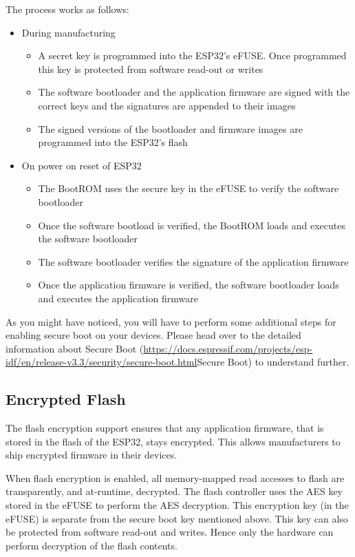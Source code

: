 \documentclass[main.tex]{subfiles}
\begin{document}
The process works as follows:
\begin{itemize}
\item During manufacturing
  \begin {itemize}
  \item A secret key is programmed into the ESP32's eFUSE. Once programmed this key is protected from software read-out or writes
  \item The software bootloader and the application firmware are signed with the correct keys and the signatures are appended to their images
  \item The signed versions of the bootloader and firmware images are programmed into the ESP32's flash
  \end {itemize}
\item On power on reset of ESP32
  \begin {itemize}
  \item The BootROM uses the secure key in the eFUSE to verify the software bootloader
  \item Once the software bootload is verified, the BootROM loads and executes the software bootloader
  \item The software bootloader verifies the signature of the application firmware
  \item Once the application firmware is verified, the software bootloader loads and executes the application firmware
  \end {itemize}
\end{itemize}

As you might have noticed, you will have to perform some additional steps for enabling secure boot on your devices. Please head over to the detailed information about Secure Boot (\url{https://docs.espressif.com/projects/esp-idf/en/release-v3.3/security/secure-boot.html}{Secure Boot}) to understand further.

\subsection{Encrypted Flash}
The flash encryption support ensures that any application firmware, that is stored in the flash of the ESP32, stays encrypted. This allows manufacturers to ship encrypted firmware in their devices.

When flash encryption is enabled, all memory-mapped read accesses to flash are transparently, and at-runtime, decrypted. The flash controller uses the AES key stored in the eFUSE to perform the AES decryption. This encryption key (in the eFUSE) is separate from the secure boot key mentioned above. This key can also be protected from software read-out and writes. Hence only the hardware can perform decryption of the flash contents.
\end{document}
